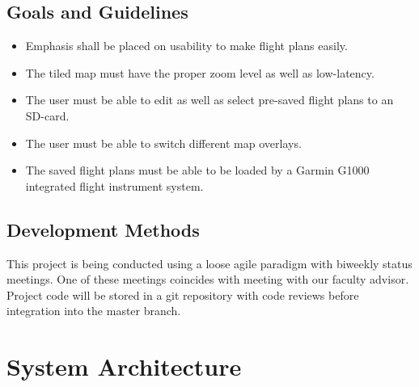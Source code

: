 \documentclass[12pt, letterpaper]{article}
\begin{document}
  \subsection{Goals and Guidelines}
    \begin{itemize}
      \setlength{\itemsep}{1pt}
      \setlength{\parskip}{0pt}
      \setlength{\parsep}{0pt}
      \item Emphasis shall be placed on usability to make flight plans easily.
      \item The tiled map must have the proper zoom level as well as low-latency.
      \item The user must be able to edit as well as select pre-saved flight plans to an SD-card.
      \item The user must be able to switch different map overlays.
      \item The saved flight plans must be able to be loaded by a Garmin G1000 integrated flight instrument system.
    \end{itemize}
  \subsection{Development Methods}
    This project is being conducted using a loose agile paradigm with biweekly status meetings.
    One of these meetings coincides with meeting with our faculty advisor.
    Project code will be stored in a git repository with code reviews before integration into the master branch.

\newpage
\section{System Architecture}\label{arch}
\end{document}
